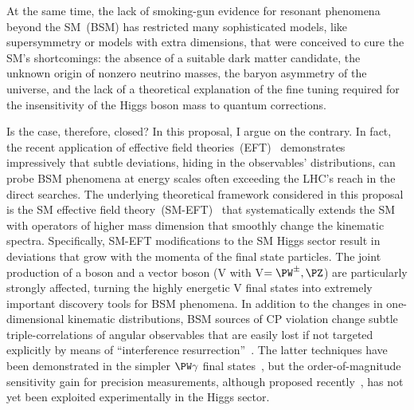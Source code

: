 \documentclass[a4paper,11pt]{article}
\renewcommand{\PV}{{{{V}}}\xspace}
\newcommand{\VH}{{{\PV}{\PH}}\xspace}
\begin{document}
At the same time, the lack of smoking-gun evidence for resonant phenomena beyond the SM~(BSM) has restricted many sophisticated models, like supersymmetry or models with extra dimensions, that were conceived to cure the SM's shortcomings: 
the absence of a suitable dark matter candidate, the unknown origin of nonzero neutrino masses, the baryon asymmetry of the universe, and the lack of a theoretical explanation of the fine tuning required for the insensitivity of the Higgs boson mass to quantum corrections. 

Is the case, therefore, closed? 
In this proposal, I argue on the contrary. 
In fact, the recent application of effective field theories~(EFT)~\cite{Grinstein:1991cd,Chiu:2007dg,Passarino:2016pzb} demonstrates impressively that subtle deviations, hiding in the observables' distributions, can probe BSM phenomena at energy scales often exceeding the LHC's reach in the direct searches. 
The underlying theoretical framework considered in this proposal is the SM effective field theory~(SM-EFT)~\cite{Jenkins:2013zja,Alonso:2013hga,Jenkins:2013wua,Englert:2014cva,Brivio:2017vri} that systematically extends the SM with operators of higher mass dimension that smoothly change the kinematic spectra.
Specifically,  SM-EFT modifications to the SM Higgs sector result in deviations that grow with the momenta of the final state particles. 
The joint production of a \PH boson and a vector boson (\VH with \PV$=\PW^{\pm},\PZ$) are particularly strongly affected, turning the highly energetic \VH final states into extremely important discovery tools for BSM phenomena. 
In addition to the changes in one-dimensional kinematic distributions, 
BSM sources of CP violation change subtle triple-correlations of angular observables that are easily lost if not targeted explicitly by means of ``interference resurrection''~\cite{Panico:2017frx}.
The latter techniques have been demonstrated in the simpler $\PW\gamma$ final states~\cite{CMS-PAS-SMP-20-005}, but the order-of-magnitude sensitivity gain for precision measurements, although proposed recently~\cite{Banerjee:2019twi}, has not yet been exploited experimentally in the Higgs sector. 
\end{document}

